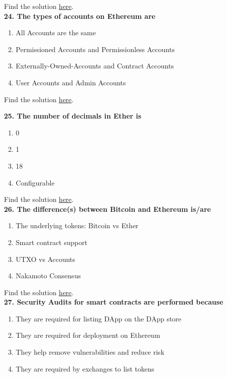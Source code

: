 Find the solution \hyperref[sec:exam1_q23]{here}.\\

\textbf{24. The types of accounts on Ethereum are}

\begin{enumerate}[label=\Alph*.]
    \item All Accounts are the same
    \item Permissioned Accounts and Permissionless Accounts
    \item Externally-Owned-Accounts and Contract Accounts
    \item User Accounts and Admin Accounts
\end{enumerate}

Find the solution \hyperref[sec:exam1_q24]{here}.\\

\pagebreak

\textbf{25. The number of decimals in Ether is}

\begin{enumerate}[label=\Alph*.]
    \item 0
    \item 1
    \item 18
    \item Configurable
\end{enumerate}

Find the solution \hyperref[sec:exam1_q25]{here}.\\

\textbf{26. The difference(s) between Bitcoin and Ethereum is/are}

\begin{enumerate}[label=\Alph*.]
    \item The underlying tokens: Bitcoin vs Ether
    \item Smart contract support
    \item UTXO vs Accounts
    \item Nakamoto Consensus
\end{enumerate}

Find the solution \hyperref[sec:exam1_q26]{here}.\\

\textbf{27. Security Audits for smart contracts are performed because}

\begin{enumerate}[label=\Alph*.]
    \item They are required for listing DApp on the DApp store
    \item They are required for deployment on Ethereum
    \item They help remove vulnerabilities and reduce risk
    \item They are required by exchanges to list tokens
\end{enumerate}

